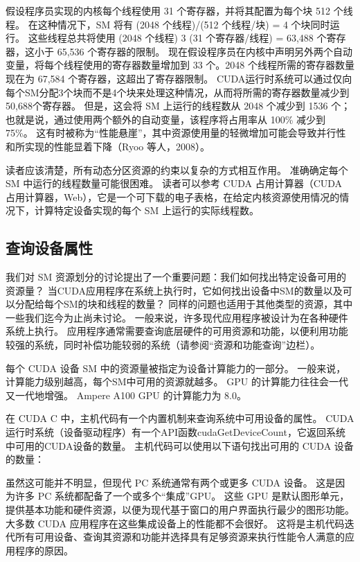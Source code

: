 假设程序员实现的内核每个线程使用 31 个寄存器，并将其配置为每个块 512 个线程。 在这种情况下，SM 将有 (2048 个线程)/(512 个线程/块) = 4 个块同时运行。 这些线程总共将使用 (2048 个线程) 3 (31 个寄存器/线程) = 63,488 个寄存器，这小于 65,536 个寄存器的限制。 现在假设程序员在内核中声明另外两个自动变量，将每个线程使用的寄存器数量增加到 33 个。2048 个线程所需的寄存器数量现在为 67,584 个寄存器，这超出了寄存器限制。 CUDA运行时系统可以通过仅向每个SM分配3个块而不是4个块来处理这种情况，从而将所需的寄存器数量减少到50,688个寄存器。 但是，这会将 SM 上运行的线程数从 2048 个减少到 1536 个； 也就是说，通过使用两个额外的自动变量，该程序将占用率从 100\% 减少到 75\%。 这有时被称为“性能悬崖”，其中资源使用量的轻微增加可能会导致并行性和所实现的性能显着下降（Ryoo 等人，2008）。

读者应该清楚，所有动态分区资源的约束以复杂的方式相互作用。 准确确定每个 SM 中运行的线程数量可能很困难。 读者可以参考 CUDA 占用计算器（CUDA 占用计算器，Web），它是一个可下载的电子表格，在给定内核资源使用情况的情况下，计算特定设备实现的每个 SM 上运行的实际线程数。

\subsection{查询设备属性}
我们对 SM 资源划分的讨论提出了一个重要问题：我们如何找出特定设备可用的资源量？ 当CUDA应用程序在系统上执行时，它如何找出设备中SM的数量以及可以分配给每个SM的块和线程的数量？ 同样的问题也适用于其他类型的资源，其中一些我们迄今为止尚未讨论。 一般来说，许多现代应用程序被设计为在各种硬件系统上执行。 应用程序通常需要查询底层硬件的可用资源和功能，以便利用功能较强的系统，同时补偿功能较弱的系统（请参阅“资源和功能查询”边栏）。

每个 CUDA 设备 SM 中的资源量被指定为设备计算能力的一部分。 一般来说，计算能力级别越高，每个SM中可用的资源就越多。 GPU 的计算能力往往会一代又一代地增强。 Ampere A100 GPU 的计算能力为 8.0。

在 CUDA C 中，主机代码有一个内置机制来查询系统中可用设备的属性。 CUDA运行时系统（设备驱动程序）有一个API函数cudaGetDeviceCount，它返回系统中可用的CUDA设备的数量。 主机代码可以使用以下语句找出可用的 CUDA 设备的数量：

虽然这可能并不明显，但现代 PC 系统通常有两个或更多 CUDA 设备。 这是因为许多 PC 系统都配备了一个或多个“集成”GPU。 这些 GPU 是默认图形单元，提供基本功能和硬件资源，以便为现代基于窗口的用户界面执行最少的图形功能。 大多数 CUDA 应用程序在这些集成设备上的性能都不会很好。 这将是主机代码迭代所有可用设备、查询其资源和功能并选择具有足够资源来执行性能令人满意的应用程序的原因。

